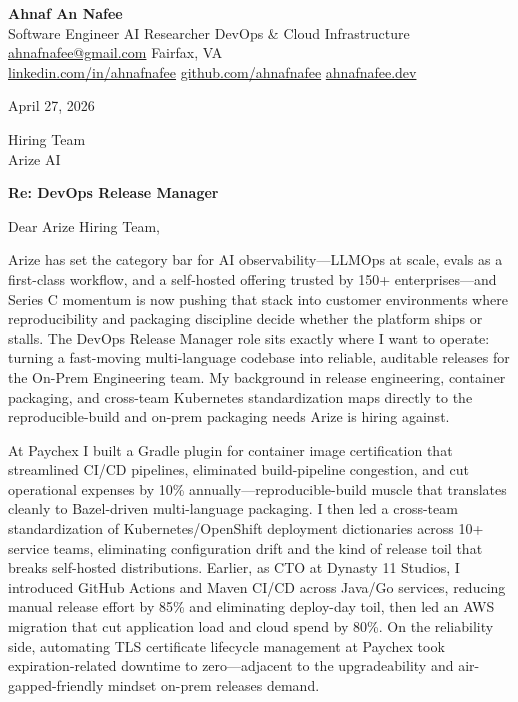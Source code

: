 \documentclass[letterpaper,11pt]{article}
\begin{document}
\begin{center}
  {\LARGE\bfseries\color{accent} Ahnaf An Nafee}\\[3pt]
  {\small Software Engineer \textbar{} AI Researcher \textbar{} DevOps \& Cloud Infrastructure}\\[4pt]
  \small
  \href{mailto:ahnafnafee@gmail.com}{ahnafnafee@gmail.com} \textbar{}
  Fairfax, VA\\
  \href{https://linkedin.com/in/ahnafnafee}{linkedin.com/in/ahnafnafee} \textbar{}
  \href{https://github.com/ahnafnafee}{github.com/ahnafnafee} \textbar{}
  \href{https://www.ahnafnafee.dev}{ahnafnafee.dev}
\end{center}

\vspace{20pt}

April 27, 2026

Hiring Team\\Arize AI

\textbf{Re: DevOps Release Manager}

Dear Arize Hiring Team,

Arize has set the category bar for AI observability---LLMOps at scale, evals as a first-class workflow, and a self-hosted offering trusted by 150+ enterprises---and Series C momentum is now pushing that stack into customer environments where reproducibility and packaging discipline decide whether the platform ships or stalls. The DevOps Release Manager role sits exactly where I want to operate: turning a fast-moving multi-language codebase into reliable, auditable releases for the On-Prem Engineering team. My background in release engineering, container packaging, and cross-team Kubernetes standardization maps directly to the reproducible-build and on-prem packaging needs Arize is hiring against.

At Paychex I built a Gradle plugin for container image certification that streamlined CI/CD pipelines, eliminated build-pipeline congestion, and cut operational expenses by 10\% annually---reproducible-build muscle that translates cleanly to Bazel-driven multi-language packaging. I then led a cross-team standardization of Kubernetes/OpenShift deployment dictionaries across 10+ service teams, eliminating configuration drift and the kind of release toil that breaks self-hosted distributions. Earlier, as CTO at Dynasty 11 Studios, I introduced GitHub Actions and Maven CI/CD across Java/Go services, reducing manual release effort by 85\% and eliminating deploy-day toil, then led an AWS migration that cut application load and cloud spend by 80\%. On the reliability side, automating TLS certificate lifecycle management at Paychex took expiration-related downtime to zero---adjacent to the upgradeability and air-gapped-friendly mindset on-prem releases demand.
\end{document}
